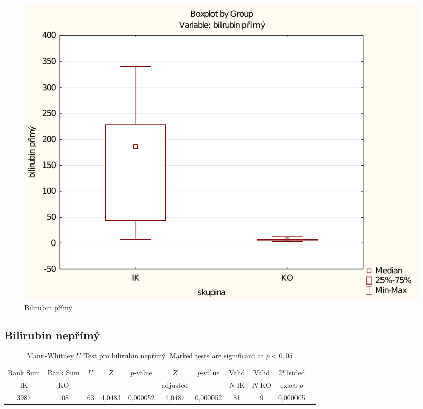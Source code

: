 \documentclass[12pt]{article}
\begin{document}
\begin{figure}[ht!]
	\begin{centering}
	\includegraphics[width=\linewidth]{bilirubin-primy.pdf}
	\caption{Bilirubin přímý}
	\end{centering}
\end{figure}

\newpage

\subsection{Bilirubin nepřímý}

\begin{table}[h]
\begin{tabular}{|c|c|c|c|c|c|c|c|c|c|c|}
\hline
Rank Sum & Rank Sum & $U$ & $Z$ & $p$-value & $Z$ & $p$-value & Valid & Valid & 2*1sided \\
IK & KO & & & & adjusted & & $N$ IK & $N$ KO & exact $p$ \\
\hline
3987 & 108 & 63 & 4,0483 & 0,000052 & 4,0487 & 0,000052 & 81 & 9 & 0,000005\\
\hline
\end{tabular}
\caption{Mann-Whitney $U$ Test pro bilirubin nepřímý. Marked tests are significant at $p < 0,05$}
\end{table}
\end{document}
